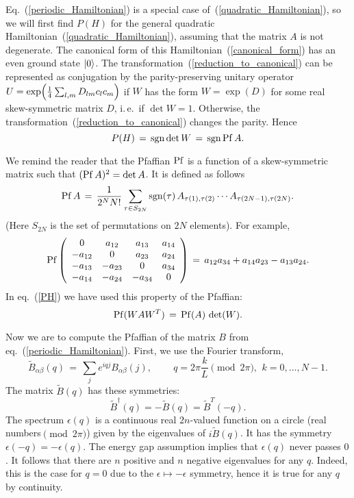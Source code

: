 Eq.~(\ref{periodic_Hamiltonian}) is a special case
of~(\ref{quadratic_Hamiltonian}), so we will first find $P(H)$ for the general
quadratic Hamiltonian~(\ref{quadratic_Hamiltonian}), assuming that the matrix
$A$ is not degenerate. The canonical form of this
Hamiltonian~(\ref{canonical_form}) has an even ground state $|0\rangle$. The
transformation~(\ref{reduction_to_canonical}) can be represented as
conjugation by the parity-preserving unitary operator
$U=\exp\Bigl(\frac{1}{4}\sum_{l,m}D_{lm}c_lc_m\Bigr)$ if $W$ has the form
$W=\exp(D)$ for some real skew-symmetric matrix $D$, i.\,e.\ if $\det
W=1$. Otherwise, the transformation~(\ref{reduction_to_canonical}) changes the
parity. Hence
\begin{equation}\label{PH}
P(H)\,=\,\mathop{\rm sgn}\nolimits\det W\,=\,\mathop{\rm sgn}\nolimits\mathop{\rm Pf}\nolimits A.
\end{equation}

We remind the reader that the Pfaffian $\mathop{\rm Pf}\nolimits$ is a function of a
skew-symmetric matrix such that $(\mathop{\rm Pf}\nolimits A)^2=\det A$. It is defined as follows
\begin{equation}\label{Pfaffian}
\mathop{\rm Pf}\nolimits A \,=\, \frac{1}{2^{N}N!}\sum_{\tau\in S_{2N}}
\mathop{\rm sgn}\nolimits(\tau)\,A_{\tau(1),\tau(2)}\cdots A_{\tau(2N-1),\tau(2N)}.
\end{equation}
(Here $S_{2N}$ is the set of permutations on $2N$ elements). For example,
\[
\mathop{\rm Pf}\nolimits \left( \begin{array}{cccc}
0&a_{12}&a_{13}&a_{14}\\
-a_{12}&0&a_{23}&a_{24}\\
-a_{13}&-a_{23}&0&a_{34}\\
-a_{14}&-a_{24}&-a_{34}&0
\end{array}\right)\, =\, a_{12}a_{34}+a_{14}a_{23}-a_{13}a_{24}.
\]
In eq.~(\ref{PH}) we have used this property of the Pfaffian:
\begin{equation}\label{Pfaffian_property}
\mathop{\rm Pf}\nolimits(WAW^T)\,=\,\mathop{\rm Pf}\nolimits(A)\,\det(W).
\end{equation}

Now we are to compute the Pfaffian of the matrix $B$ from
eq.~(\ref{periodic_Hamiltonian}). First, we use the Fourier transform,
\begin{equation}\label{Fourier_transform}
{\tilde B}_{\alpha\beta}(q) \,=\,
\sum_{j} e^{iqj}B_{\alpha\beta}(j), \qquad\
q=2\pi\frac{k}{L}\pmod{2\pi},\,\ k=0,\ldots,N-1.
\end{equation}
The matrix ${\tilde B}(q)$ has these symmetries:
\begin{equation}
{\tilde B}^\dagger(q)=-{\tilde B}(q)={\tilde B}^T(-q).
\end{equation}
The spectrum $\epsilon(q)$ is a continuous real $2n$-valued function on a
circle (real numbers$\pmod{2\pi}$) given by the eigenvalues of $i{\tilde
B}(q)$. It has the symmetry $\epsilon(-q)=-\epsilon(q)$. The energy gap
assumption implies that $\epsilon(q)$ never passes $0$. It follows that there
are $n$ positive and $n$ negative eigenvalues for any $q$. Indeed, this is the
case for $q=0$ due to the $\epsilon\mapsto-\epsilon$ symmetry, hence it is
true for any $q$ by continuity.

